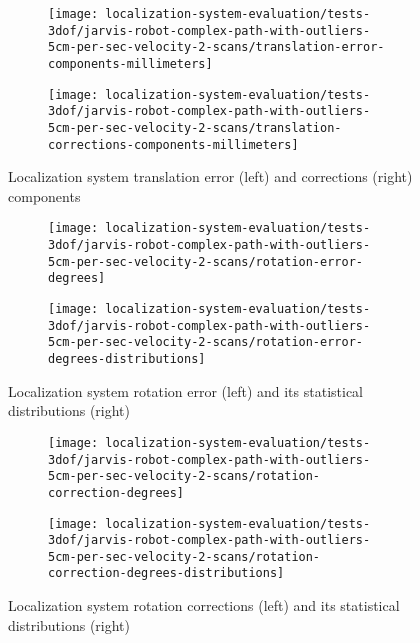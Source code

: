 \begin{figure}[ht]
	\centering
	\begin{subfigure}[h]{.497\textwidth}
		\centering
		\texttt{[image: localization-system-evaluation/tests-3dof/jarvis-robot-complex-path-with-outliers-5cm-per-sec-velocity-2-scans/translation-error-components-millimeters]}
	\end{subfigure}
	\begin{subfigure}[h]{.497\textwidth}
		\centering
		\texttt{[image: localization-system-evaluation/tests-3dof/jarvis-robot-complex-path-with-outliers-5cm-per-sec-velocity-2-scans/translation-corrections-components-millimeters]}
	\end{subfigure}
	\caption{Localization system translation error (left) and corrections (right) components}
	\label{fig:localization-system-evaluation_jarvis-robot-complex-path-with-outliers-5cm-per-sec-velocity-2-scans_translation-errors-components}
\end{figure}

\begin{figure}[ht]
	\centering
	\begin{subfigure}[h]{.497\textwidth}
		\centering
		\texttt{[image: localization-system-evaluation/tests-3dof/jarvis-robot-complex-path-with-outliers-5cm-per-sec-velocity-2-scans/rotation-error-degrees]}
	\end{subfigure}
	\begin{subfigure}[h]{.497\textwidth}
		\centering
		\texttt{[image: localization-system-evaluation/tests-3dof/jarvis-robot-complex-path-with-outliers-5cm-per-sec-velocity-2-scans/rotation-error-degrees-distributions]}
	\end{subfigure}
	\caption{Localization system rotation error (left) and its statistical distributions (right)}
	\label{fig:localization-system-evaluation_jarvis-robot-complex-path-with-outliers-5cm-per-sec-velocity-2-scans_rotation-errors}
\end{figure}

\begin{figure}[ht]
	\centering
	\begin{subfigure}[h]{.497\textwidth}
		\centering
		\texttt{[image: localization-system-evaluation/tests-3dof/jarvis-robot-complex-path-with-outliers-5cm-per-sec-velocity-2-scans/rotation-correction-degrees]}
	\end{subfigure}
	\begin{subfigure}[h]{.497\textwidth}
		\centering
		\texttt{[image: localization-system-evaluation/tests-3dof/jarvis-robot-complex-path-with-outliers-5cm-per-sec-velocity-2-scans/rotation-correction-degrees-distributions]}
	\end{subfigure}
	\caption{Localization system rotation corrections (left) and its statistical distributions (right)}
	\label{fig:localization-system-evaluation_jarvis-robot-complex-path-with-outliers-5cm-per-sec-velocity-2-scans_rotation-errors-corrections}
\end{figure}

